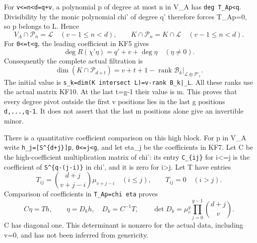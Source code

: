For \texttt{v\textless{}=n\textless{}d=q\textquotesingle{}+v}, a polynomial p of degree at most n in V\_A has \texttt{deg\ T\_Ap\textless{}q\textquotesingle{}}. Divisibility by the monic polynomial chi' of degree q' therefore forces T\_Ap=0, so p belongs to L. Hence \[
V_A\cap\mathcal P_n=\mathcal L\quad(v-1\le n<d),\qquad
K\cap\mathcal P_n=K\cap\mathcal L\quad(v-1\le n<d).
\tag{KF11}
\] For \texttt{0\textless{}=t\textless{}g}, the leading coefficient in KF5 gives \[
\deg R(\chi'\eta)=q'+v+\deg\eta\quad(\eta\ne0).
\] Consequently the complete actual filtration is \[
\dim(K\cap\mathcal P_{d+t})
=v+t+1-\operatorname{rank}
 \mathcal B_k\big|_{\mathcal L\oplus\mathcal P'_t}.
\tag{KF12}
\] The initial value is \nolinkurl{s_k=dim(K intersect L)=v-rank B_k|_L}. All these ranks use the actual matrix KF10. At the last t=g-1 their value is m. This proves that every degree pivot outside the first v positions lies in the last g positions \texttt{d,...,q-1}. It does not assert that the last m positions alone give an invertible minor.

There is a quantitative coefficient comparison on this high block. For p in V\_A write \texttt{h\_j={[}S\^{}\{d+j\}{]}p}, \texttt{0\textless{}=j\textless{}g}, and let eta\_j be the coefficients in KF7. Let C be the high-coefficient multiplication matrix of chi': its entry \texttt{C\_\{ij\}} for i\textless=j is the coefficient of \texttt{S\textquotesingle{}\^{}\{q\textquotesingle{}-(j-i)\}} in chi', and it is zero for i\textgreater j. Let T have entries \[
T_{ij}=\binom{d+j}{v+j-i}\mu_{v+j-i}\quad(i\le j),\qquad
T_{ij}=0\quad(i>j).
\tag{KF13}
\] Comparison of coefficients in \texttt{T\_Ap=chi\textquotesingle{}\ eta} proves \[
C\eta=Th,\qquad \eta=D_kh,\quad D_k=C^{-1}T,
\qquad
\det D_k=\mu_v^g\prod_{j=0}^{g-1}\binom{d+j}{v}.
\tag{KF14}
\] C has diagonal one. This determinant is nonzero for the actual data, including v=0, and has not been inferred from genericity.

